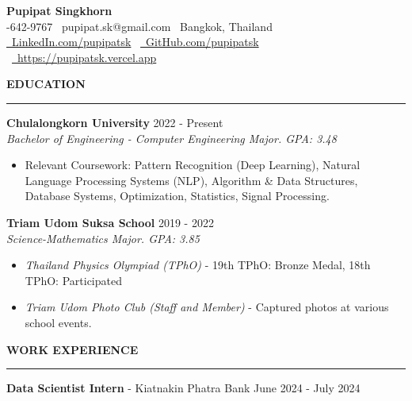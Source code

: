 \documentclass[a4paper, 11pt]{article}
\begin{document}
\begin{center}
    {\Large \textbf{Pupipat Singkhorn}} \\
    -642-9767 \textbullet\ pupipat.sk@gmail.com \textbullet\ Bangkok, Thailand
    \\
    \href{www.linkedin.com/in/pupipatsk}{\faLinkedin\ LinkedIn.com/pupipatsk}
    \textbullet\ \href{https://github.com/pupipatsk}{\faGithub\ GitHub.com/pupipatsk}
    \textbullet\ \href{https://pupipatsk.vercel.app}{\faGlobe\ https://pupipatsk.vercel.app}
\end{center}

\textbf{EDUCATION}
\vspace{5pt}
{\hrule}
\vspace{6pt}

\textbf{Chulalongkorn University} \hfill 2022 - Present\\
\textit{Bachelor of Engineering - Computer Engineering Major. GPA: 3.48}
\begin{itemize}[noitemsep, topsep=0pt, partopsep=0pt, parsep=0pt]
    \item Relevant Coursework: Pattern Recognition (Deep Learning), Natural Language Processing Systems (NLP), Algorithm \& Data Structures, Database Systems, Optimization, Statistics, Signal Processing.
\end{itemize}

\vspace{2pt}

\textbf{Triam Udom Suksa School} \hfill 2019 - 2022\\
\textit{Science-Mathematics Major. GPA: 3.85}
\begin{itemize}[noitemsep, topsep=0pt, partopsep=0pt, parsep=0pt]
    \item \textit{Thailand Physics Olympiad (TPhO)} - 19th TPhO: Bronze Medal, 18th TPhO: Participated
    \item \textit{Triam Udom Photo Club (Staff and Member)} - Captured photos at various school events.
\end{itemize}

\vspace{6pt}
\textbf{WORK EXPERIENCE}
\vspace{5pt}
{\hrule}
\vspace{6pt}

\textbf{Data Scientist Intern} - Kiatnakin Phatra Bank \hfill June 2024 - July 2024
\end{document}
